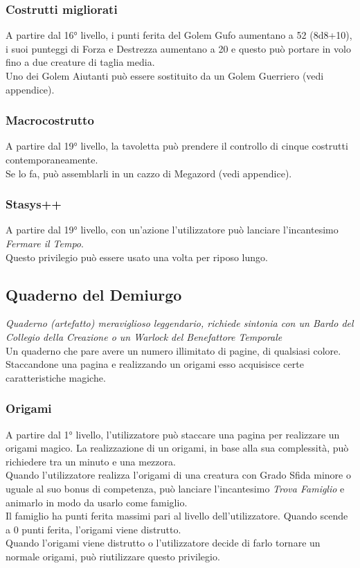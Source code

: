 \subsubsection{Costrutti migliorati}
A partire dal 16° livello, i punti ferita del Golem Gufo aumentano a 52 (8d8+10), i suoi punteggi di Forza e Destrezza aumentano a 20 e questo può portare in volo fino a due creature di taglia media.\\
Uno dei Golem Aiutanti può essere sostituito da un Golem Guerriero (vedi appendice).

\subsubsection{Macrocostrutto}
A partire dal 19° livello, la tavoletta può prendere il controllo di cinque costrutti contemporaneamente.\\ Se lo fa, può assemblarli in un cazzo di Megazord (vedi appendice).

\subsubsection{Stasys++}
A partire dal 19° livello, con un'azione l'utilizzatore può lanciare l'incantesimo \textit{Fermare il Tempo}.\\
Questo privilegio può essere usato una volta per riposo lungo.

\subsection{Quaderno del Demiurgo}
\textit{Quaderno (artefatto) meraviglioso leggendario, richiede sintonia con un Bardo del Collegio della Creazione o un Warlock del Benefattore Temporale}\\
Un quaderno che pare avere un numero illimitato di pagine, di qualsiasi colore.
Staccandone una pagina e realizzando un origami esso acquisisce certe caratteristiche magiche.

\subsubsection{Origami}
A partire dal 1° livello, l'utilizzatore può staccare una pagina per realizzare un origami magico. La realizzazione di un origami, in base alla sua complessità, può richiedere tra un minuto e una mezzora.\\
Quando l'utilizzatore realizza l'origami di una creatura con Grado Sfida minore o uguale al suo bonus di competenza, può lanciare l'incantesimo \textit{Trova Famiglio} e animarlo in modo da usarlo come famiglio.\\
Il famiglio ha punti ferita massimi pari al livello dell'utilizzatore. Quando scende a 0 punti ferita, l'origami viene distrutto.\\
Quando l'origami viene distrutto o l'utilizzatore decide di farlo tornare un normale origami, può riutilizzare questo privilegio.

